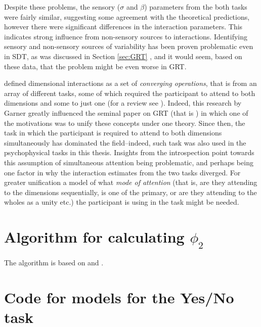 \documentclass{article}\usepackage{knitr}
\begin{document}
Despite these problems, the sensory ($\sigma$ and $\beta$) parameters from the both tasks were fairly similar, suggesting some agreement with the theoretical predictions, however there were significant differences in the interaction parameters. This indicates strong influence from non-sensory sources to interactions. Identifying sensory and non-sensory sources of variability has been proven problematic even in SDT, as was discussed in Section \ref{sec:GRT} \textit{}, and it would seem, based on these data, that the problem might be even worse in GRT. 

\citet{garner1974} defined dimensional interactions as a set of \textit{converging operations}, that is from an array of different tasks, some of which required the participant to attend to both dimensions and some to just one (for a review see \citet{burns2014}). Indeed, this research by Garner greatly influenced the seminal paper on GRT (that is \citet{ashby1986}) in which one of the motivations was to unify these concepts under one theory. Since then, the task in which the participant is required to attend to both dimensions simultaneously has dominated the field--indeed, such task was also used in the psychophysical tasks in this thesis. Insights from the introspection point towards this assumption of simultaneous attention being problematic, and perhaps being one factor in why the interaction estimates from the two tasks diverged. For greater unification a model of what \textit{mode of attention} (that is, are they attending to the dimensions sequentially, is one of the primary, or are they attending to the wholes as a unity etc.) the participant is using in the task might be needed.


\clearpage



\newpage


\appendix
{}

\section{Algorithm for calculating \texorpdfstring{$\phi_2$}{bivariate CDF}}

The algorithm is based on \citet{boys1989} and \citet{pan2017}.



\newpage
\section{Code for models for the Yes/No task}
\end{document}

